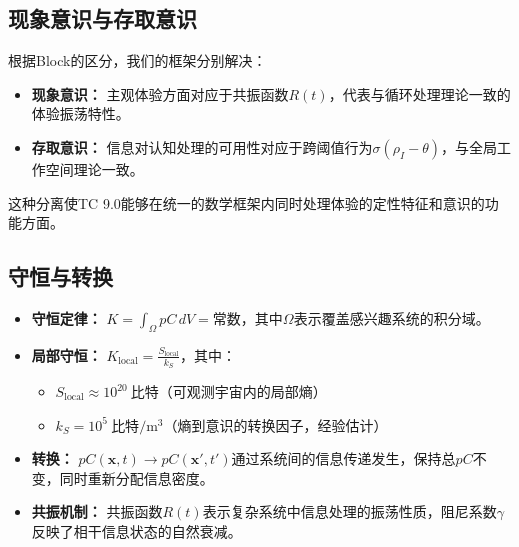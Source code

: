 \documentclass[12pt]{article}
\newcommand{\bit}{\text{比特}}
\begin{document}
\subsection{现象意识与存取意识}
根据Block的区分\cite{block2007}，我们的框架分别解决：

\begin{itemize}
    \item \textbf{现象意识：} 主观体验方面对应于共振函数$R(t)$，代表与循环处理理论一致的体验振荡特性\cite{lamme2006}。
    
    \item \textbf{存取意识：} 信息对认知处理的可用性对应于跨阈值行为$\sigma(\rho_I - \theta)$，与全局工作空间理论一致\cite{dehaene2011}。
\end{itemize}

这种分离使TC 9.0能够在统一的数学框架内同时处理体验的定性特征和意识的功能方面。

\subsection{守恒与转换}
\begin{itemize}
    \item \textbf{守恒定律：} $K = \int_{\Omega} pC \, dV = \text{常数}$，其中$\Omega$表示覆盖感兴趣系统的积分域。
    
    \item \textbf{局部守恒：} $K_{\text{local}} = \frac{S_{\text{local}}}{k_S}$，其中：
    \begin{itemize}[label=--]
        \item $S_{\text{local}} \approx 10^{20}~\bit$（可观测宇宙内的局部熵\cite{susskind1995}）
        \item $k_S = 10^{5}~\bit/\text{m}^3$（熵到意识的转换因子，经验估计）
    \end{itemize}
    
    \item \textbf{转换：} $pC(\mathbf{x}, t) \rightarrow pC(\mathbf{x'}, t')$通过系统间的信息传递发生，保持总$pC$不变，同时重新分配信息密度。
    
    \item \textbf{共振机制：} 共振函数$R(t)$表示复杂系统中信息处理的振荡性质，阻尼系数$\gamma$反映了相干信息状态的自然衰减。
\end{itemize}
\end{document}

